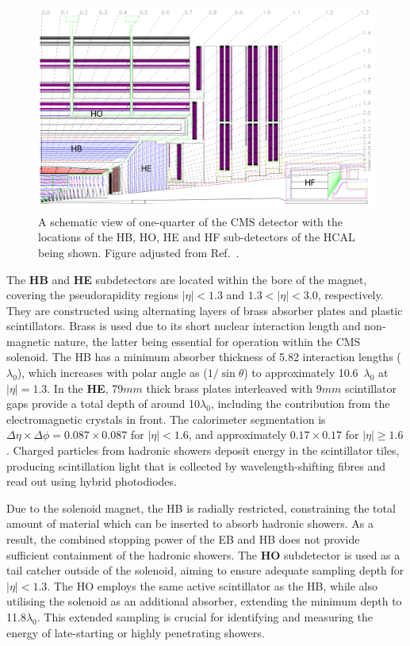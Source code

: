 \begin{figure}[h]
\centering
\includegraphics[width= 1.0\textwidth]{Figures/Chapter3/CMS_HCAL.pdf}
\caption[Schematic of CMS detector highlighting HCAL sub-detectors]{A schematic view of one-quarter of the CMS detector with the locations of the HB, HO, HE and HF sub-detectors of the HCAL being shown. Figure adjusted from Ref.~\cite{LHC_CMS}.}
\label{Figure:Chapter3_CMS_HCAL}
\end{figure}

The \textbf{HB} and \textbf{HE} subdetectors are located within the bore of the magnet, covering the pseudorapidity regions $|\eta| < 1.3$ and $1.3 < |\eta| < 3.0$, respectively. They are constructed using alternating layers of brass absorber plates and plastic scintillators. Brass is used due to its short nuclear interaction length and non-magnetic nature, the latter being essential for operation within the CMS solenoid. The HB has a minimum absorber thickness of 5.82 interaction lengths ($\lambda_0$), which increases with polar angle as ($1/\sin\theta$) to approximately 10.6~$\lambda_0$ at $|\eta| = 1.3$. In the \textbf{HE}, 79$\unit{mm}$ thick brass plates interleaved with 9$\unit{mm}$ scintillator gaps provide a total depth of around 10$\lambda_0$, including the contribution from the electromagnetic crystals in front. The calorimeter segmentation is $\Delta\eta \times \Delta\phi = 0.087 \times 0.087$ for $|\eta| < 1.6$, and approximately $0.17 \times 0.17$ for $|\eta| \geq 1.6$. Charged particles from hadronic showers deposit energy in the scintillator tiles, producing scintillation light that is collected by wavelength-shifting fibres and read out using hybrid photodiodes.

Due to the solenoid magnet, the HB is radially restricted, constraining the total amount of material which can be inserted to absorb hadronic showers. As a result, the combined stopping power of the EB and HB does not provide sufficient containment of the hadronic showers. The \textbf{HO} subdetector is used as a tail catcher outside of the solenoid, aiming to ensure adequate sampling depth for $|\eta| < 1.3$. The HO employs the same active scintillator as the HB, while also utilising the solenoid as an additional absorber, extending the minimum depth to 11.8$\lambda_0$. This extended sampling is crucial for identifying and measuring the energy of late-starting or highly penetrating showers.


